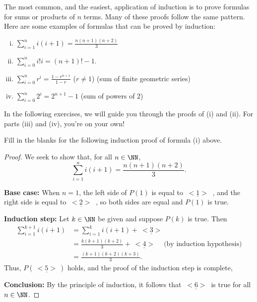 The most common, and the easiest, application of induction is to prove
formulas for sums or products of $n$ terms. Many of these  proofs follow
the same pattern. Here are  some examples of formulas that can be proved by induction:

\begin{enumerate}[(i)]
\item 
$\sum_{i=1}^n i(i+1)=\frac{n(n+1)(n+2)}{3}$ 
\item
$\sum_{i=0}^n i! i = (n+1)!-1$. 
\item
$\sum_{i=0}^n r^i=\frac{1-r^{n+1}}{1-r}$ ($r\not=1$)
(sum of finite geometric series)
\item 
$\sum_{i=0}^n 2^i=2^{n+1}-1$ (sum of powers of $2$)
\end{enumerate}

In the following exercises, we will guide you through the proofs of (i) and (ii). For parts (iii) and (iv), you're on your own!

\begin{exercise}{}
Fill in the blanks for the following induction proof of formula (i) above.

\begin{proof}
We seek to show that, for all $n\in\NN$,  
\[
\sum_{i=1}^n i(i+1)=\frac{n(n+1)(n+2)}{3}. 
\tag{ 	$P(n)$}
\]

\noindent
\textbf{Base case:} When $n=1$, the left side of $P(1)$ is equal to $\underline{~<1>~}$ ,
and the
right side is equal to $\underline{~<2>~}$ , so both sides are equal and $P(1)$ is
true.

\noindent
\textbf{Induction step:} Let $k\in\NN$ be given and suppose 
$P(k)$ is true. Then
\begin{align*}
\sum_{i=1}^{k+1}i(i+1)
&=
\sum_{i=1}^{k}i(i+1)
+\underline{~<3>~}
\\
&=\frac{k(k+1)(k+2)}{3} 
+\underline{~<4>~} 
\quad \text{(by induction hypothesis)}
\\
&=\frac{(k+1)(k+2)(k+3)}{3}.
\end{align*}
Thus, $P(\underline{~<5>~})$ holds, and the proof of the induction step is complete, 

\noindent
\textbf{Conclusion:}
By the principle of induction,  it follows that
$\underline{~<6>~}$  is true for all $n\in\NN$.  
\end{proof}

\end{exercise}

